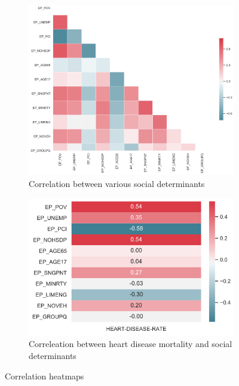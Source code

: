 \documentclass[journal,12pt,onecolumn]{IEEEtran}
\begin{document}
\begin{figure}[H]
  \centering
  \begin{subfigure}{.5\textwidth}
  \centering
  \includegraphics[width=\linewidth]{figures/ml1.PNG}
  \caption{Correlation between various social determinants}
  \label{fig:sviheatmap}
\end{subfigure}%
\begin{subfigure}{.5\textwidth}
  \centering
  \includegraphics[width=\linewidth]{figures/ml2.PNG}
  \caption{Correleation between heart disease mortality and social determinants}
  \label{fig:hdheatmap}
\end{subfigure}
\caption{Correlation heatmaps}
\label{}
\end{figure}
\end{document}
